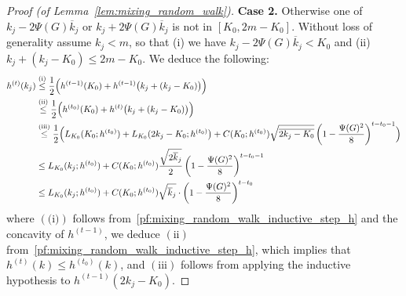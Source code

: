 \documentclass{article}
\newcommand{\1}{\mathbf{1}}
\theoremstyle{definition}
\theoremstyle{remark}
\begin{document}
\begin{proof}[Proof (of Lemma~\ref{lem:mixing_random_walk})]
	\textbf{Case 2.} Otherwise one of $k_j - 2 \Psi(G) \overline{k}_j$ or $k_j + 2 \Psi(G) \overline{k}_j$ is not in $[K_0,2m  - K_0]$. Without loss of generality assume $k_j < m$, so that (i) we have $k_j - 2 \Psi(G) \overline{k}_j < K_0$ and (ii) $k_j + (k_j - K_0) \leq 2m - K_0$. We deduce the following:
	\begin{align*}
	h^{(t)}(k_j) & \overset{(\textrm{i})}{\leq} \frac{1}{2}\Bigl(h^{(t - 1)}(K_0) + h^{(t - 1)}\bigl(k_j + (k_j - K_0)\bigr)\Bigr) \\
	& \overset{(\textrm{ii})}{\leq} \frac{1}{2}\Bigl(h^{(t_0)}(K_0) + h^{(t)}\bigl(k_j + (k_j - K_0)\bigr)\Bigr) \\
	& \overset{(\textrm{iii})}{\leq}\frac{1}{2}\Bigl(L_{K_0}(K_0;h^{(t_0)}) + L_{K_0}(2k_j - K_0; h^{(t_0)}\bigr) + C(K_0;h^{(t_0)})\sqrt{\overline{2k_j - K_0}}\left(1 - \frac{\Psi(G)^2}{8}\right)^{t - t_0 - 1}\Bigr) \\
	& \leq L_{K_0}(k_j; h^{(t_0)}) + C(K_0;h^{(t_0)}) \frac{\sqrt{2\overline{k}_j}}{2} \left(1 - \frac{\Psi(G)^2}{8}\right)^{t - t_0 - 1} \\
	& \leq L_{K_0}(k_j;h^{(t_0)}) + C(K_0;h^{(t_0)}) \sqrt{\overline{k}_j} \cdot \left(1 - \frac{\Psi(G)^2}{8}\right)^{t - t_0}
	\end{align*}
	where $(\textrm{(i)})$ follows from~\eqref{pf:mixing_random_walk_inductive_step_h} and the concavity of $h^{(t - 1)}$,  we deduce $(\textrm{ii})$ from~\eqref{pf:mixing_random_walk_inductive_step_h}, which implies that $h^{(t)}(k) \leq h^{(t_0)}(k)$, and $(\textrm{iii})$ follows from applying the inductive hypothesis to $h^{(t - 1)}(2k_j - K_0)$. 	
\end{proof}
\end{document}
